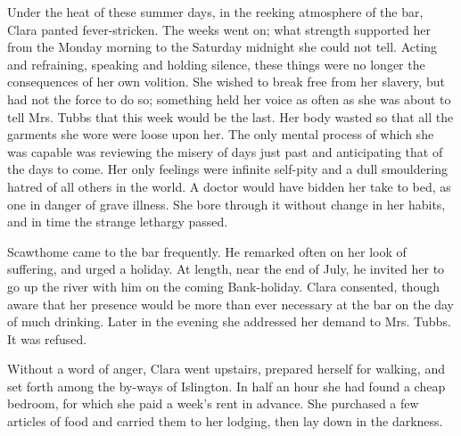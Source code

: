 Under the heat of these summer days, in the reeking atmosphere of the
bar, Clara panted fever-stricken. The weeks went on; what strength
supported her from the Monday morning to the Saturday midnight she could
not tell. Acting and refraining, speaking and holding silence, these
things were no longer the consequences of her own volition. She wished
to break free from her slavery, but had not the force to do so;
something held her voice as often as she was about to tell Mrs. Tubbs
that this week would be the last. Her body wasted so that all the
garments she wore were loose upon her. The only mental process of which
she was capable was reviewing the misery of days just past and
anticipating that of the days to come. Her only feelings were infinite
self-pity and a dull smouldering hatred of all others in the world. A
doctor would have bidden her take {\protect\hypertarget{214}{}{}}to bed,
as one in danger of grave illness. She bore through it without change in
her habits, and in time the strange lethargy passed.

Scawthome came to the bar frequently. He remarked often on her look of
suffering, and urged a holiday. At length, near the end of July, he
invited her to go up the river with him on the coming Bank-holiday.
Clara consented, though aware that her presence would be more than ever
necessary at the bar on the day of much drinking. Later in the evening
she addressed her demand to Mrs. Tubbs. It was refused.

Without a word of anger, Clara went upstairs, prepared herself for
walking, and set forth among the by-ways of Islington. In half an hour
she had found a cheap bedroom, for which she paid a week's rent in
advance. She purchased a few articles of food and carried them to her
lodging, then lay down in the darkness.
